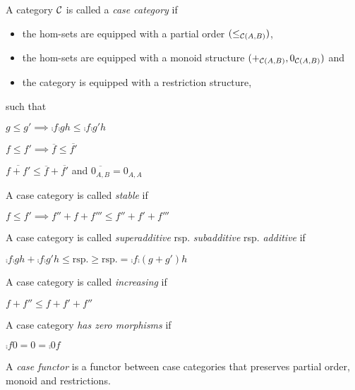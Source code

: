 \documentclass[runningheads,envcountsame]{llncs}
\begin{document}
\begin{definition} \label{def:case category}
    A category $\mathcal{C}$ is called a \emph{case category} if
    \begin{itemize}
        \item the hom-sets are equipped with a partial order $(\leq_{\mathcal{C}(A, B)})$,
        \item the hom-sets are equipped with a monoid structure $(+_{\mathcal{C}(A, B)}, 0_{\mathcal{C}(A, B)})$ and
        \item the category is equipped with a restriction structure,
    \end{itemize}
    such that
    \begin{definitionlist}
        \item \label{def:monotone} $g \leq g' \implies \comp{f}{\comp{g}{h}} \leq \comp{f}{\comp{g'}{h}}$
        \item \label{def:comp-restr-order} $f \leq f' \implies \overline{f} \leq \overline{f'}$
        \item \label{def:comp-restr-monoid} $\overline{f + f'} \leq \overline{f} + \overline{f'}$ and $\overline{0_{A,B}} = 0_{A, A}$
    \end{definitionlist}
    
    A case category is called \emph{stable} if \begin{definitionlist}[resume]
    \item \label{def:stable} $f \leq f' \implies f'' + f + f''' \leq f'' + f' + f'''$ 
    \end{definitionlist}
    
    A case category is called \emph{superadditive} rsp. \emph{subadditive} rsp. \emph{additive} if \begin{definitionlist}[resume]
    \item \label{def:additive} $\comp{f}{\comp{g}{h}} + \comp{f}{\comp{g'}{h}} \leq \text{rsp.} \geq \text{rsp.} = \comp{f}{\comp{(g + g')}{h}}$ 
    \end{definitionlist}
    
    A case category is called \emph{increasing} if \begin{definitionlist}[resume]
    \item \label{def:increasing} $f + f'' \leq f + f' + f''$ 
    \end{definitionlist}
    
    A case category \emph{has zero morphisms} if \begin{definitionlist}[resume]
    \item \label{def:zero} $\comp{f}{0} = 0 = \comp{0}{f}$ 
    \end{definitionlist}
    
    A \emph{case functor} is a functor between case categories that preserves partial order, monoid and restrictions.
\end{definition}
\end{document}
